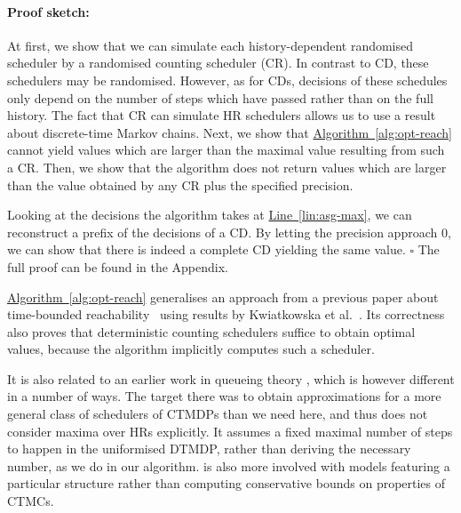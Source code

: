 \documentclass[10pt,twocolumn]{article}
\newenvironment{proofsketch}{\paragraph{Proof sketch:}}{\hfill$\square$}
\newcommand{\refalg}[1]{\texorpdfstring{\hyperref[alg:#1]{Algorithm~\ref*{alg:#1}}}{Algorithm~\ref*{alg:#1}}}
\newcommand{\reflin}[1]{\texorpdfstring{\hyperref[lin:#1]{Line~\ref*{lin:#1}}}{Line~\ref*{lin:#1}}}
\begin{document}
\begin{proofsketch}
  At first, we show that we can simulate each history-dependent
  randomised scheduler by a randomised counting scheduler (CR).
  In contrast to CD, these schedulers may be randomised.
  However, as for CDs, decisions of these schedules only depend on the number of steps which have passed rather than on the full history.
  The fact that CR can simulate HR schedulers allows us to use a result about discrete-time Markov chains.
  Next, we show that \refalg{opt-reach} cannot yield values which are
  larger than the maximal value resulting from such a CR. Then, we show
  that the algorithm does not return values which are larger than the
  value obtained by any CR plus the specified precision.

  Looking at the decisions the algorithm takes at \reflin{asg-max}, we
  can reconstruct a prefix of the decisions of a CD. By letting the
  precision approach $0$, we can show that there is indeed a complete CD
  yielding the same value.
\end{proofsketch}
The full proof can be found in the Appendix.

\refalg{opt-reach} generalises an approach from a previous paper about
time-bounded reachability~\cite{BaierHKH05} using results by
Kwiatkowska et al.~\cite{KwiatkowskaNP06}. Its correctness also
proves that deterministic counting schedulers suffice to obtain
optimal values, because the algorithm implicitly computes such a
scheduler.

It is also related to an earlier work in queueing theory
\cite{Lippman76}, which is however different in a number of ways. The
target there was to obtain approximations for a more general class of
schedulers of CTMDPs than we need here, and thus does not consider
maxima over HRs explicitly. It assumes a fixed maximal number of steps
to happen in the uniformised DTMDP, rather than deriving the necessary
number, as we do in our algorithm. \cite{Lippman76} is also more
involved with models featuring a particular structure rather than
computing conservative bounds on properties of CTMCs.
\end{document}
